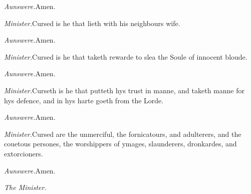 \emph{Aunswere.}Amen.

\emph{Minister.}Cursed is he that lieth with his neighbours
wife.

\emph{Aunswere.}Amen.

\emph{Minister.}Cursed is he that taketh rewarde to
slea the Soule of innocent bloude.

\emph{Aunswere.}Amen.

\emph{Minister.}Curseth is he that putteth hys trust
in manne, and taketh manne for hys defence, and in hys harte goeth from
the Lorde.

\emph{Aunswere.}Amen.

\emph{Minister.}Cursed are the unmerciful, the fornicatours,
and adulterers, and the couetous persones, the worshippers of ymages,
slaunderers, dronkardes, and extorcioners.

\emph{Aunswere.}Amen.

\emph{The
Minister.}

